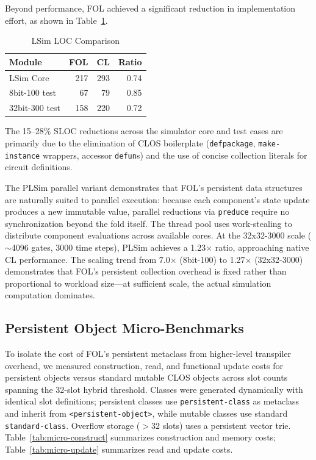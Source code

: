\documentclass[sigconf,nonacm,review]{acmart}
\begin{document}
Beyond performance, FOL achieved a significant reduction in implementation effort, as shown in Table~\ref{tab:lsim-loc}.

\begin{table}[htbp]
\small
\caption{LSim LOC Comparison}
\label{tab:lsim-loc}
\begin{tabular}{lrrr}
\toprule
\textbf{Module} & \textbf{FOL} & \textbf{CL} & \textbf{Ratio} \\
\midrule
LSim Core & 217 & 293 & 0.74 \\
8bit-100 test & 67 & 79 & 0.85 \\
32bit-300 test & 158 & 220 & 0.72 \\
\bottomrule
\end{tabular}
\end{table}

The 15--28\% SLOC reductions across the simulator core and test cases are primarily due to the elimination of CLOS boilerplate (\texttt{defpackage}, \texttt{make-instance} wrappers, accessor \texttt{defun}s) and the use of concise collection literals for circuit definitions.

The PLSim parallel variant demonstrates that FOL's persistent data structures are naturally suited to parallel execution: because each component's state update produces a new immutable value, parallel reductions via \texttt{preduce} require no synchronization beyond the fold itself. The thread pool uses work-stealing to distribute component evaluations across available cores. At the 32x32-3000 scale ($\sim$4096 gates, 3000 time steps), PLSim achieves a 1.23$\times$ ratio, approaching native CL performance. The scaling trend from 7.0$\times$ (8bit-100) to 1.27$\times$ (32x32-3000) demonstrates that FOL's persistent collection overhead is fixed rather than proportional to workload size---at sufficient scale, the actual simulation computation dominates.

\subsection{Persistent Object Micro-Benchmarks}

To isolate the cost of FOL's persistent metaclass from higher-level transpiler overhead, we measured construction, read, and functional update costs for persistent objects versus standard mutable CLOS objects across slot counts spanning the 32-slot hybrid threshold. Classes were generated dynamically with identical slot definitions; persistent classes use \texttt{persistent-class} as metaclass and inherit from \texttt{<persistent-object>}, while mutable classes use standard \texttt{standard-class}. Overflow storage ($>32$ slots) uses a persistent vector trie. Table~\ref{tab:micro-construct} summarizes construction and memory costs; Table~\ref{tab:micro-update} summarizes read and update costs.
\end{document}
